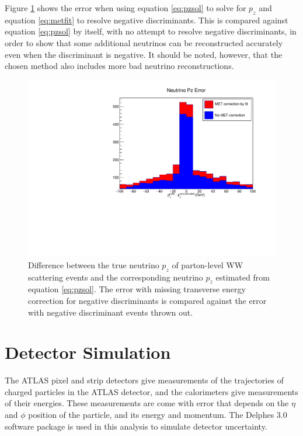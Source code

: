 \documentclass[10pt]{ucscthesisbs}
\begin{document}
Figure \ref{figure:pzerrorbestmethods} shows the error when using equation \ref{eq:pzsol} to solve for $p_z$ and equation \ref{eq:metfit} to resolve negative discriminants. This is compared against equation \ref{eq:pzsol} by itself, with no attempt to resolve negative discriminants, in order to show that some additional neutrinos can be reconstructed accurately even when the discriminant is negative. It should be noted, however, that the chosen method also includes more bad neutrino reconstructions. 
\begin{figure}
\includegraphics[height=8cm]{images/PzErrorBestMethods}
\caption{Difference between the true neutrino $p_z$ of parton-level WW scattering events and the corresponding neutrino $p_z$ estimated from equation \ref{eq:pzsol}. The error with missing transverse energy correction for negative discriminants is compared against the error with negative discriminant events thrown out.}
\label{figure:pzerrorbestmethods}
\end{figure}
\section{Detector Simulation}
The ATLAS pixel and strip detectors give measurements of the trajectories of charged particles in the ATLAS detector, and the calorimeters give measurements of their energies. These measurements are come with error that depends on the $\eta$ and $\phi$ position of the particle, and its energy and momentum. The Delphes 3.0 software package is used in this analysis to simulate detector uncertainty.
\end{document}
